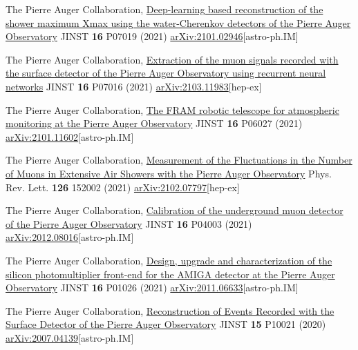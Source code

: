\begin{etaremune}
\item {}The Pierre Auger Collaboration, \href{https://doi.org/10.1088/1748-0221/16/07/P07019}{Deep-learning based reconstruction of the shower maximum Xmax using the water-Cherenkov detectors of the Pierre Auger Observatory} JINST {\bf{16}} P07019 (2021) \href{https://arxiv.org/abs/2101.02946}{arXiv:2101.02946}[astro-ph.IM]

\item {}The Pierre Auger Collaboration, \href{https://doi.org/10.1088/1748-0221/16/07/P07016}{Extraction of the muon signals recorded with the surface detector of the Pierre Auger Observatory using recurrent neural networks} JINST {\bf{16}} P07016 (2021) \href{https://arxiv.org/abs/2103.11983}{arXiv:2103.11983}[hep-ex]

\item {}The Pierre Auger Collaboration, \href{https://doi.org/10.1088/1748-0221/16/06/P06027}{The FRAM robotic telescope for atmospheric monitoring at the Pierre Auger Observatory} JINST {\bf{16}} P06027 (2021) \href{https://arxiv.org/abs/2101.11602}{arXiv:2101.11602}[astro-ph.IM]

\item {} The Pierre Auger Collaboration, \href{https://doi.org/10.1103/PhysRevLett.126.152002}{Measurement of the Fluctuations in the Number of Muons in Extensive Air Showers with the Pierre Auger Observatory} Phys. Rev. Lett. {\bf{126}} 152002 (2021) \href{https://arxiv.org/abs/2102.07797}{arXiv:2102.07797}[hep-ex]

\item {}The Pierre Auger Collaboration, \href{https://doi.org/10.1088/1748-0221/16/04/P04003}{Calibration of the underground muon detector of the Pierre Auger Observatory} JINST {\bf{16}} P04003 (2021) \href{https://arxiv.org/abs/2012.08016}{arXiv:2012.08016}[astro-ph.IM]

\item {}The Pierre Auger Collaboration, \href{https://doi.org/10.1088/1748-0221/16/01/P01026}{Design, upgrade and characterization of the silicon photomultiplier front-end for the AMIGA detector at the Pierre Auger Observatory} JINST {\bf{16}} P01026 (2021) \href{ https://arxiv.org/abs/2011.06633}{arXiv:2011.06633}[astro-ph.IM]

\item {}The Pierre Auger Collaboration, \href{https://doi.org/10.1088/1748-0221/15/10/P10021}{Reconstruction of Events Recorded with the Surface Detector of the Pierre Auger Observatory} JINST {\bf{15}} P10021 (2020) \href{https://arxiv.org/abs/2007.04139}{arXiv:2007.04139}[astro-ph.IM]


\end{etaremune}
